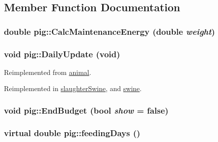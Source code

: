 \subsection{Member Function Documentation}
\hypertarget{classpig_a054e084f2dd4b4db9ac06fb8eac96603}{
\subsubsection[{CalcMaintenanceEnergy}]{\setlength{\rightskip}{0pt plus 5cm}double pig::CalcMaintenanceEnergy (double {\em weight})}}
\label{classpig_a054e084f2dd4b4db9ac06fb8eac96603}
\hypertarget{classpig_ace82dae0cc5b75ed3051b145e12d1803}{
\subsubsection[{DailyUpdate}]{\setlength{\rightskip}{0pt plus 5cm}void pig::DailyUpdate (void)}}
\label{classpig_ace82dae0cc5b75ed3051b145e12d1803}


Reimplemented from \hyperlink{classanimal_a96c8db4af03ae55b4acb96ed250ea065}{animal}.

Reimplemented in \hyperlink{classslaughter_swine_a878b44d9124ee9a550f86ecf353e1401}{slaughterSwine}, and \hyperlink{classswine_aa5b1551767e9bc33a2dad33ef32627fb}{swine}.\hypertarget{classpig_aa3f9514039eb69dbe5ce8b44a398930e}{
\subsubsection[{EndBudget}]{\setlength{\rightskip}{0pt plus 5cm}void pig::EndBudget (bool {\em show} = {\ttfamily false})}}
\label{classpig_aa3f9514039eb69dbe5ce8b44a398930e}
\hypertarget{classpig_a5ab403443122aaaeb16d82c5844b75f6}{
\subsubsection[{feedingDays}]{\setlength{\rightskip}{0pt plus 5cm}virtual double pig::feedingDays ()}}
\label{classpig_a5ab403443122aaaeb16d82c5844b75f6}


